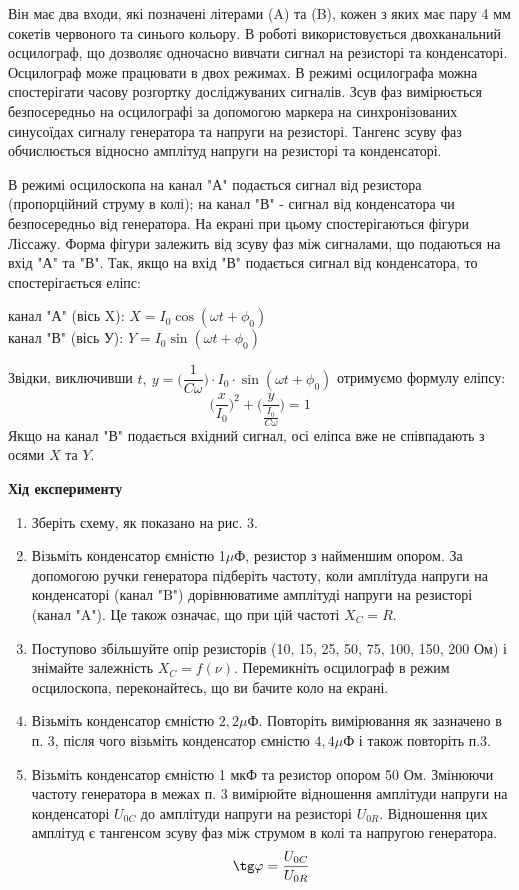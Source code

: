 \documentclass[a4paper,12pt]{article}
\begin{document}
\begin{justify}
    Він має два входи, які позначені літерами (A) та (B), кожен з яких має пару 4 мм 
    сокетів червоного та синього кольору. В роботі використовується двохканальний 
    осцилограф, що дозволяє одночасно вивчати сигнал на резисторі та конденсаторі. 
    Осцилограф може працювати в двох режимах. В режимі осцилографа можна 
    спостерігати часову розгортку досліджуваних сигналів. Зсув фаз вимірюється 
    безпосередньо на осцилографі за допомогою маркера на синхронізованих 
    синусоїдах сигналу генератора та напруги на резисторі. Тангенс зсуву фаз 
    обчислюється відносно амплітуд напруги на резисторі та конденсаторі.

    В режимі осцилоскопа на канал "А" подається сигнал від резистора 
    (пропорційний струму в колі); на канал "В" - сигнал від конденсатора чи 
    безпосередньо від генератора. На екрані при цьому спостерігаються фігури Ліссажу. 
    Форма фігури залежить від зсуву фаз між сигналами, що подаються на вхід "А" та 
    "В". Так, якщо на вхід "В" подається сигнал від конденсатора, то спостерігається еліпс:
    \begin{center}
        канал "А" (вісь X): $X=I_0\cos(\omega t+\phi_0)$ \\
        канал "В" (вісь У): $Y=I_0\sin(\omega t+\phi_0)$
    \end{center}
    Звідки, виключивши $t,\: y=\biggl(\dfrac{1}{C\omega}\biggr)\cdot I_0\cdot\sin(\omega t+\phi_0)$ отримуємо формулу еліпсу:
    $$\biggl(\dfrac{x}{I_0}\biggr)^2+\biggl(\dfrac{y}{\frac{I_0}{C\omega}}\biggr)=1$$
    Якщо на канал "В" подається вхідний сигнал, осі еліпса вже не співпадають з осями $X$ та $Y$.

\newpage
    \begin{center}
		\textbf{Хід експерименту}
	\end{center}
    \begin{enumerate}
        \item Зберіть схему, як показано на рис. 3.
        \item Візьміть конденсатор ємністю 1$\mu$Ф, резистор з найменшим опором. За допомогою 
        ручки генератора підберіть частоту, коли амплітуда напруги на конденсаторі (канал "B") 
        дорівнюватиме амплітуді напруги на резисторі (канал "A"). Це також означає, що при цій частоті $X_C=R$.
        \item Поступово збільшуйте опір резисторів (10, 15, 25, 50, 75, 100, 150, 200 Ом) і 
        знімайте залежність $X_C=f(\nu)$. Перемикніть осцилограф в режим осцилоскопа, переконайтесь, що ви бачите коло на екрані.
        \item Візьміть конденсатор ємністю $2,2\mu$Ф. Повторіть вимірювання як зазначено в п. 3, 
        після чого візьміть конденсатор ємністю $4,4\mu$Ф і також повторіть п.3.
        \item Візьміть конденсатор ємністю 1 мкФ та резистор опором 50 Ом. Змінюючи 
        частоту генератора в межах п. 3 вимірюйте відношення амплітуди напруги на 
        конденсаторі $U_{0C}$ до амплітуди напруги на резисторі $U_{0R}$. Відношення цих амплітуд 
        є тангенсом зсуву фаз між струмом в колі та напругою генератора.
        $$\tg\varphi=\dfrac{U_{0C}}{U_{0R}}$$
    \end{enumerate}


\end{justify}
\end{document}
